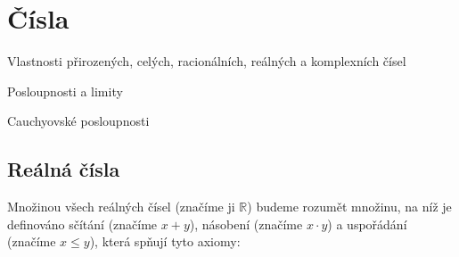 \section{Čísla}


\begin{pozadavky}
\begin{pitemize}
\item Vlastnosti přirozených, celých, racionálních, reálných a komplexních čísel
\item Posloupnosti a limity
\item Cauchyovské posloupnosti
\end{pitemize}
\end{pozadavky}

\subsection{Reálná čísla}
Množinou všech reálných čísel (značíme ji $\mathbb{R}$) budeme rozumět množinu, na níž je definováno sčítání (značíme $x+y$), násobení (značíme $x\cdot y$) a uspořádání (značíme $x \le y$), která spňují tyto axiomy:

